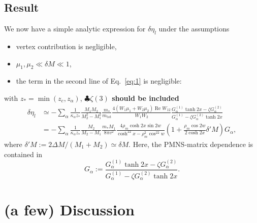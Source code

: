 \documentclass[a4paper,11pt,captions=tableheading,DIV=12]{scrartcl}
\numberwithin{equation}{section}
\newcommand{\TODO}[1]{{\textbf{\color{red}$\clubsuit$#1}}}
\renewcommand{\Re}{\mathop{\mathrm{Re}}}
\newcommand\mtot{m_{\mathrm{tot}}}
\begin{document}
\subsection{Result}
We now have a simple analytic expression for $\delta \eta_l$ under the assumptions
\begin{itemize}
 \item vertex contribution is negligible,
 \item $\mu_1, \mu_2 \ll \delta M \ll 1$,
 \item the term in the second line of Eq.~\ref{eq:1} is negligible:
\end{itemize}
with $z_*=\min(z_c,z_\alpha)$, \TODO{$\zeta(3)$ should be included}
\begin{align}
  \delta \eta_l
&\simeq
-\sum_\alpha \frac1{\kappa_\alpha z_*}
\frac{M_1M_2}{M_2^2-M_1^2}
\frac{m_*}{\mtot}
\frac{4(W_1 \mu_1 + W_2 \mu_2)\Re W_{12}}{W_1W_2}
\frac{G_\alpha^{(1)}\tanh2x-\zeta G_\alpha^{(2)}}
{G_\alpha^{(1)}-\zeta G_\alpha^{(2)}\tanh2x}
\\&=
-\sum_\alpha \frac1{\kappa_\alpha z_*}
\frac{M_2}{M_2-M_1}
\frac{m_* M_1}{8\pi v^2}
\frac{4\rho_m\cosh2x\sin2w}{\cosh^22x-\rho_m^2\cos^22w}
\left(1+\frac{\rho_m\cos2w}{2\cosh2x}\delta'M\right)
G_\alpha,\label{eq:2}
\end{align}
where $\delta'M:=2\Delta M/(M_1+M_2)\simeq\delta M$.
Here, the PMNS-matrix dependence is contained in
\begin{equation}
 G_\alpha :=
\frac{G_\alpha^{(1)}\tanh2x-\zeta G_\alpha^{(2)}}
{G_\alpha^{(1)}-\zeta G_\alpha^{(2)}\tanh2x}.
\end{equation}



\section{(a few) Discussion}
\end{document}
